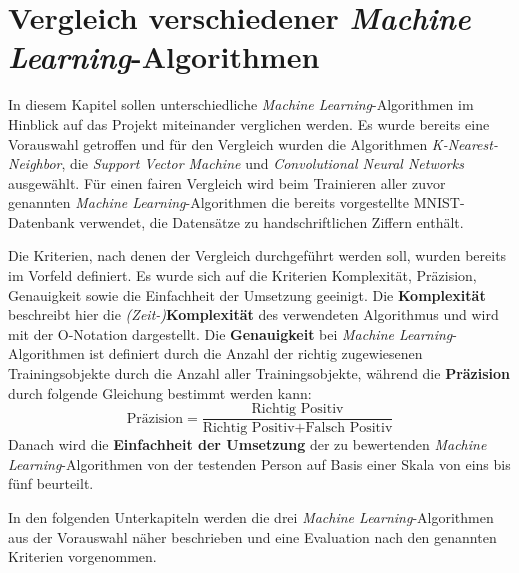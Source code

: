 \section{Vergleich verschiedener \textit{Machine Learning}-Algorithmen} \label{sec:compare}
In diesem Kapitel sollen unterschiedliche \textit{Machine Learning}-Algorithmen im Hinblick auf das Projekt miteinander verglichen werden.
Es wurde bereits eine Vorauswahl getroffen und für den Vergleich wurden die Algorithmen \textit{K-Nearest-Neighbor}, die \textit{Support Vector Machine} und
\textit{Convolutional Neural Networks} ausgewählt. Für einen fairen Vergleich wird beim Trainieren aller zuvor genannten \textit{Machine Learning}-Algorithmen
die bereits vorgestellte MNIST-Datenbank verwendet, die Datensätze zu handschriftlichen Ziffern enthält.

Die Kriterien, nach denen der Vergleich durchgeführt werden soll, wurden bereits im Vorfeld definiert. Es wurde sich auf die Kriterien Komplexität,
Präzision, Genauigkeit sowie die Einfachheit der Umsetzung geeinigt. Die \textbf{Komplexität} beschreibt hier die \textit{(Zeit-)}\textbf{Komplexität} des verwendeten Algorithmus und wird mit der O-Notation dargestellt.
Die \textbf{Genauigkeit} bei \textit{Machine Learning}-Algorithmen ist definiert durch die Anzahl der richtig zugewiesenen Trainingsobjekte durch die Anzahl aller
Trainingsobjekte, während die \textbf{Präzision} durch folgende Gleichung bestimmt werden kann:
\[ \text{Präzision} = \frac{\text{Richtig Positiv}}{\text{Richtig Positiv} + \text{Falsch Positiv}} \]
Danach wird die \textbf{Einfachheit der Umsetzung} der zu bewertenden \textit{Machine Learning}-Algorithmen von der testenden Person auf Basis einer Skala von
eins bis fünf beurteilt.

In den folgenden Unterkapiteln werden die drei \textit{Machine Learning}-Algorithmen aus der Vorauswahl näher beschrieben und eine Evaluation nach den genannten
Kriterien vorgenommen.


